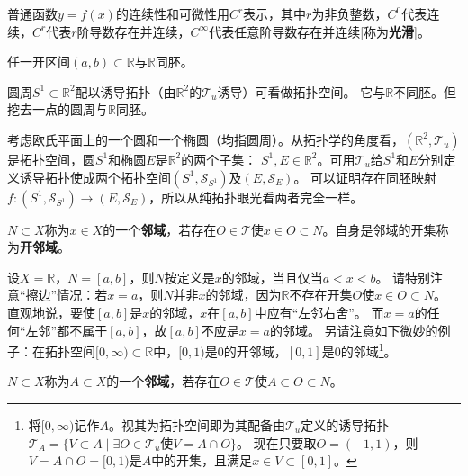 普通函数$y = f(x)$的连续性和可微性用$C^r$表示，其中$r$为非负整数，$C^0$代表连续，$C^r$代表$r$阶导数存在并连续，$C^\infty$代表任意阶导数存在并连续[称为\textbf{光滑}]。

\begin{example}
任一开区间$(a, b) \subset \mathbb{R}$与$\mathbb{R}$同胚。
\end{example}

\begin{example}
圆周$S^1 \subset \mathbb{R}^2$配以诱导拓扑（由$\mathbb{R}^2$的$\mathscr{T}_u$诱导）可看做拓扑空间。
它与$\mathbb{R}$不同胚。但挖去一点的圆周与$\mathbb{R}$同胚。
\end{example}

\begin{example}
考虑欧氏平面上的一个圆和一个椭圆（均指圆周）。从拓扑学的角度看，$(\mathbb{R}^2, \mathscr{T}_u)$是拓扑空间，圆$S^1$和椭圆$E$是$\mathbb{R}^2$的两个子集：
$S^1, E \in \mathbb{R}^2$。可用$\mathscr{T}_u$给$S^1$和$E$分别定义诱导拓扑使成两个拓扑空间$(S^1, \mathscr{S}_{S^1})$及$(E, \mathscr{S}_E)$。
可以证明存在同胚映射$f \colon (S^1, \mathscr{S}_{S^1}) \to (E, \mathscr{S}_E)$，所以从纯拓扑眼光看两者完全一样。
\end{example}

\begin{definition}
$N \subset X$称为$x \in X$的一个\textbf{邻域}，若存在$O \in \mathscr{T}$使$x \in O \subset N$。自身是邻域的开集称为\textbf{开邻域}。  
\end{definition}

\begin{note}
设$X = \mathbb{R}$，$N = [a, b]$，则$N$按定义是$x$的邻域，当且仅当$a < x < b$。
请特别注意``擦边''情况：若$x = a$，则$N$并非$x$的邻域，因为$\mathbb{R}$不存在开集$O$使$x \in O \subset N$。
直观地说，要使$[a, b]$是$x$的邻域，$x$在$[a, b]$中应有``左邻右舍''。
而$x = a$的任何``左邻''都不属于$[a, b]$，故$[a, b]$不应是$x = a$的邻域。
另请注意如下微妙的例子：在拓扑空间$[0, \infty) \subset \mathbb{R}$中，$[0, 1)$是$0$的开邻域，$[0, 1]$是$0$的邻域\footnote{
将$[0, \infty)$记作$A$。视其为拓扑空间即为其配备由$\mathscr{T}_u$定义的诱导拓扑$\mathscr{T}_A = \{V \subset A \mid \exists O \in \mathscr{T}_u \text{使} V = A \cap O\}$。
现在只要取$O = (-1, 1)$，则$V = A \cap O = [0, 1)$是$A$中的开集，且满足$x \in V \subset [0, 1]$。
}。
\end{note}

\begin{definition}
$N \subset X$称为$A \subset X$的一个\textbf{邻域}，若存在$O \in \mathscr{T}$使$A \subset O \subset N$。
\end{definition}

